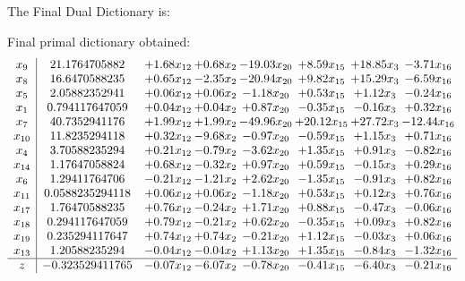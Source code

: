 \documentclass[8pt]{article}
\begin{document}
The Final Dual Dictionary is: 

 Final primal dictionary obtained: 
\[\begin{array}{c| c c@{\hskip 2pt} c@{\hskip 2pt} c@{\hskip 2pt} c@{\hskip 2pt} c@{\hskip 2pt} c@{\hskip 2pt} }
 x_{9}   &  21.1764705882 & +  1.68 x_{12} & +  0.68 x_{2} & -19.03 x_{20} & +  8.59 x_{15} & + 18.85 x_{3} & -3.71 x_{16}\\
 x_{8}   &  16.6470588235 & +  0.65 x_{12} & -2.35 x_{2} & -20.94 x_{20} & +  9.82 x_{15} & + 15.29 x_{3} & -6.59 x_{16}\\
 x_{5}   &  2.05882352941 & +  0.06 x_{12} & +  0.06 x_{2} & -1.18 x_{20} & +  0.53 x_{15} & +  1.12 x_{3} & -0.24 x_{16}\\
 x_{1}   &  0.794117647059 & +  0.04 x_{12} & +  0.04 x_{2} & +  0.87 x_{20} & -0.35 x_{15} & -0.16 x_{3} & +  0.32 x_{16}\\
 x_{7}   &  40.7352941176 & +  1.99 x_{12} & +  1.99 x_{2} & -49.96 x_{20} & + 20.12 x_{15} & + 27.72 x_{3} & -12.44 x_{16}\\
 x_{10}   &  11.8235294118 & +  0.32 x_{12} & -9.68 x_{2} & -0.97 x_{20} & -0.59 x_{15} & +  1.15 x_{3} & +  0.71 x_{16}\\
 x_{4}   &  3.70588235294 & +  0.21 x_{12} & -0.79 x_{2} & -3.62 x_{20} & +  1.35 x_{15} & +  0.91 x_{3} & -0.82 x_{16}\\
 x_{14}   &  1.17647058824 & +  0.68 x_{12} & -0.32 x_{2} & +  0.97 x_{20} & +  0.59 x_{15} & -0.15 x_{3} & +  0.29 x_{16}\\
 x_{6}   &  1.29411764706 & -0.21 x_{12} & -1.21 x_{2} & +  2.62 x_{20} & -1.35 x_{15} & -0.91 x_{3} & +  0.82 x_{16}\\
 x_{11}   &  0.0588235294118 & +  0.06 x_{12} & +  0.06 x_{2} & -1.18 x_{20} & +  0.53 x_{15} & +  0.12 x_{3} & +  0.76 x_{16}\\
 x_{17}   &  1.76470588235 & +  0.76 x_{12} & -0.24 x_{2} & +  1.71 x_{20} & +  0.88 x_{15} & -0.47 x_{3} & -0.06 x_{16}\\
 x_{18}   &  0.294117647059 & +  0.79 x_{12} & -0.21 x_{2} & +  0.62 x_{20} & -0.35 x_{15} & +  0.09 x_{3} & +  0.82 x_{16}\\
 x_{19}   &  0.235294117647 & +  0.74 x_{12} & +  0.74 x_{2} & -0.21 x_{20} & +  1.12 x_{15} & -0.03 x_{3} & +  0.06 x_{16}\\
 x_{13}   &  1.20588235294 & -0.04 x_{12} & -0.04 x_{2} & +  1.13 x_{20} & +  1.35 x_{15} & -0.84 x_{3} & -1.32 x_{16}\\
\hline
z    &  -0.323529411765 & -0.07 x_{12} & -6.07 x_{2} & -0.78 x_{20} & -0.41 x_{15} & -6.40 x_{3} & -0.21 x_{16}\\
\end{array}\]
\end{document}
